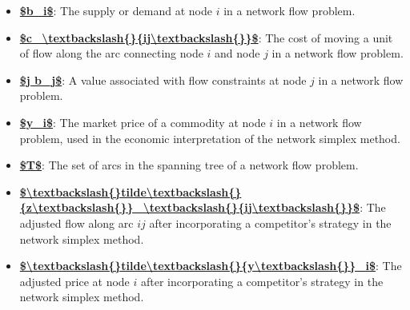 \documentclass{article}%
\begin{document}
\begin{itemize}[leftmargin=*]%
\item \href{https://www.math.purdue.edu/~yipn/421/2024-11-21-EconNetSimplex.pdf#page=1}{\textbf{\$b\_i\$}}: The supply or demand at node $i$ in a network flow problem.%
\item \href{https://www.math.purdue.edu/~yipn/421/2024-11-21-EconNetSimplex.pdf#page=1}{\textbf{\$c\_\textbackslash{}textbackslash\{\}\{ij\textbackslash{}textbackslash\{\}\}\$}}: The cost of moving a unit of flow along the arc connecting node $i$ and node $j$ in a network flow problem.%
\item \href{https://www.math.purdue.edu/~yipn/421/2024-11-21-EconNetSimplex.pdf#page=1}{\textbf{\$j b\_j\$}}: A value associated with flow constraints at node $j$ in a network flow problem.%
\item \href{https://www.math.purdue.edu/~yipn/421/2024-11-21-EconNetSimplex.pdf#page=4}{\textbf{\$y\_i\$}}: The market price of a commodity at node $i$ in a network flow problem, used in the economic interpretation of the network simplex method.%
\item \href{https://www.math.purdue.edu/~yipn/421/2024-11-21-EconNetSimplex.pdf#page=4}{\textbf{\$T\$}}: The set of arcs in the spanning tree of a network flow problem.%
\item \href{https://www.math.purdue.edu/~yipn/421/2024-11-21-EconNetSimplex.pdf#page=6}{\textbf{\$\textbackslash{}textbackslash\{\}tilde\textbackslash{}textbackslash\{\}\{z\textbackslash{}textbackslash\{\}\}\_\textbackslash{}textbackslash\{\}\{ij\textbackslash{}textbackslash\{\}\}\$}}: The adjusted flow along arc $ij$ after incorporating a competitor's strategy in the network simplex method.%
\item \href{https://www.math.purdue.edu/~yipn/421/2024-11-21-EconNetSimplex.pdf#page=6}{\textbf{\$\textbackslash{}textbackslash\{\}tilde\textbackslash{}textbackslash\{\}\{y\textbackslash{}textbackslash\{\}\}\_i\$}}: The adjusted price at node $i$ after incorporating a competitor's strategy in the network simplex method.%
\end{itemize}

%
\end{document}
